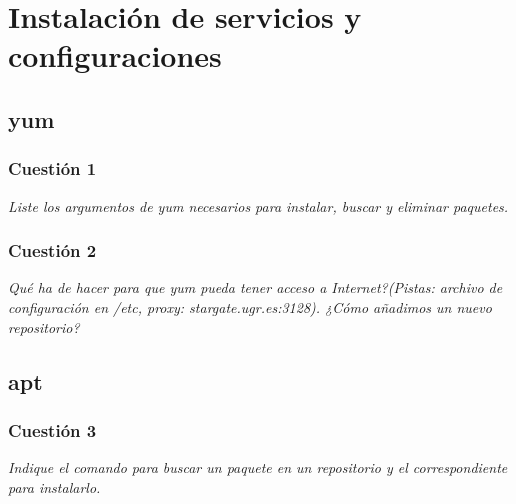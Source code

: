 



\maketitle %
\newpage %
\tableofcontents %
\listoffigures
\listoftables
\newpage


\section{Instalación de servicios y configuraciones}

\subsection{yum}
\subsubsection{Cuestión 1}
\textit{Liste los argumentos de yum necesarios para instalar, buscar y eliminar paquetes.}

\subsubsection{Cuestión 2}
\textit{Qué ha de hacer para que yum pueda tener acceso a Internet?(Pistas: archivo de configuración en /etc, proxy: stargate.ugr.es:3128). ¿Cómo añadimos un nuevo repositorio?}



\subsection{apt}
\subsubsection{Cuestión 3}
\textit{Indique el comando para buscar un paquete en un repositorio y el correspondiente para instalarlo.}

